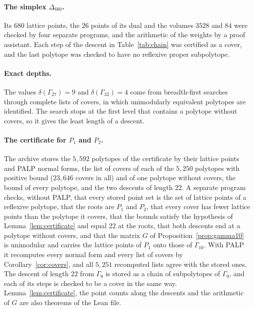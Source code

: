 \documentclass[manuscript]{aomart}
\theoremstyle{definition}
\theoremstyle{remark}
\newcommand{\Dbig}{\Delta_{680}}
\begin{document}
\paragraph*{The simplex $\Dbig$.} Its $680$ lattice points, the $26$ points
of its dual and the volumes $3528$ and $84$ were checked by four separate
programs, and the arithmetic of the weights by a proof assistant. Each
step of the descent in Table~\ref{tab:chain} was certified as a cover, and
the last polytope was checked to have no reflexive proper subpolytope.

\paragraph*{Exact depths.} The values $\delta(\Gamma_{27})=9$ and
$\delta(\Gamma_{32})=4$ come from breadth-first searches through complete
lists of covers, in which unimodularly equivalent polytopes are identified.
The search stops at the first level that contains a polytope without
covers, so it gives the least length of a descent.

\paragraph*{The certificate for $P_1$ and $P_2$.} The archive stores the
$5{,}592$ polytopes of the certificate by their lattice points and PALP
normal forms, the list of covers of each of the $5{,}250$ polytopes with
positive bound ($23{,}646$ covers in all) and of one polytope without
covers, the bound of every polytope, and
the two descents of length $22$. A separate program checks, without PALP,
that every stored point set is the set of lattice points of a reflexive
polytope, that the roots are $P_1$ and $P_2$, that every cover has fewer
lattice points than the polytope it covers, that the bounds satisfy the
hypothesis of Lemma~\ref{lem:certificate} and equal $22$ at the roots,
that both descents end at a polytope without covers, and that the matrix
$G$ of Proposition~\ref{prop:gamma10} is unimodular and carries the
lattice points of $P_1$ onto those of $\Gamma_{10}$. With PALP it
recomputes every normal form and every list of covers by
Corollary~\ref{cor:covers}, and all $5{,}251$ recomputed lists agree with
the stored ones. The descent of length $22$ from $\Gamma_9$ is
stored as a chain of subpolytopes of $\Gamma_9$, and each of its steps is
checked to be a cover in the same way. Lemma~\ref{lem:certificate}, the
point counts along the descents and the arithmetic of $G$ are also
theorems of the Lean file.
\end{document}
